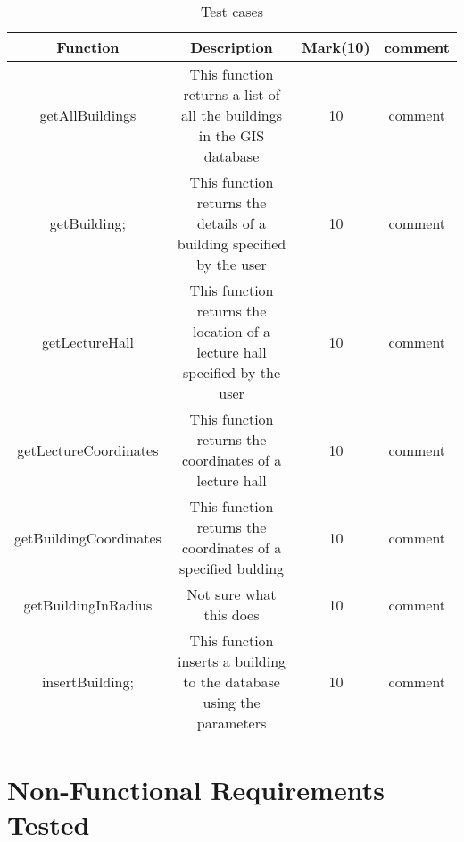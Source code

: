 \documentclass[12pt]{article}
\begin{document}
		
		\begin{table}[h!]	
			\newlength{\longline}
			\settowidth{\longline}{This function returns a}
			\centering
			\caption{Test cases }
			\label{tab:table1}
			\begin{tabular}{|c|c|c|c|}
				
				\hline
				\hline
				Function  & Description & Mark(10)  & comment\\
				\hline
				\hline
				
				getAllBuildings  & \parbox[t]{\longline}{This function returns a list of all the buildings in the GIS database} & 10 & \parbox[t]{\longline}{comment}\\
				
				\hline
				getBuilding; & \parbox[t]{\longline}{This function returns the details of a building specified by the user} &  10 & \parbox[t]{\longline}{comment}\\
				\hline
				getLectureHall & \parbox[t]{\longline}{This function returns the location of a lecture hall specified by the user} & 10 & \parbox[t]{\longline}{comment}\\
				\hline
				getLectureCoordinates & \parbox[t]{\longline}{This function returns the coordinates of a lecture hall} & 10 & \parbox[t]{\longline}{comment}\\
				\hline
				getBuildingCoordinates & \parbox[t]{\longline}{This function returns the coordinates of a specified bulding} &  10 & \parbox[t]{\longline}{comment}\\
				\hline
				getBuildingInRadius & \parbox[t]{\longline}{Not sure what this does} & 10 & \parbox[t]{\longline}{comment}\\
				\hline
				insertBuilding; & \parbox[t]{\longline}{This function inserts a building to the database using the parameters} &  10 & \parbox[t]{\longline}{comment}\\
				\hline
			\end{tabular}
	
		\end{table}
	
		



\section{Non-Functional Requirements Tested}
\end{document}
